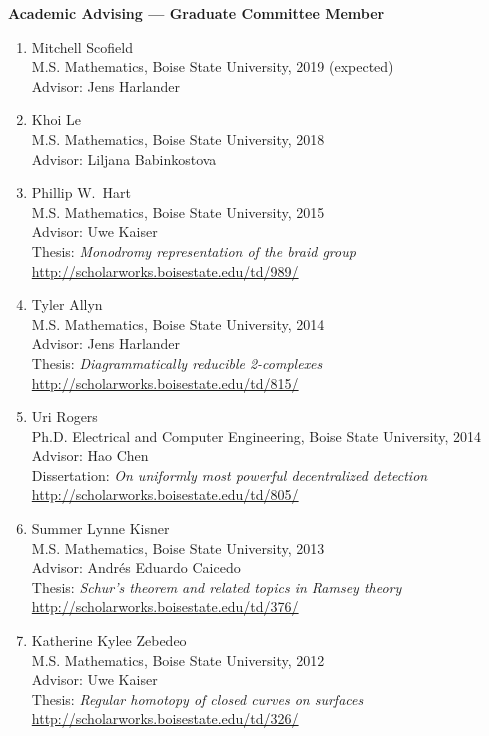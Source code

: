 \documentclass[12pt]{article}
\begin{document}
\textbf{Academic Advising --- Graduate Committee Member}
\begin{enumerate}

\item Mitchell Scofield \\
M.S. Mathematics, Boise State University, 2019 (expected) \\
Advisor: Jens Harlander

\item Khoi Le \\
M.S. Mathematics, Boise State University, 2018 \\
Advisor: Liljana Babinkostova

\item Phillip W.\ Hart \\
M.S. Mathematics, Boise State University, 2015 \\
Advisor: Uwe Kaiser \\
Thesis: \emph{Monodromy representation of the braid group} \\
\url{http://scholarworks.boisestate.edu/td/989/}

\item Tyler Allyn \\
M.S. Mathematics, Boise State University, 2014 \\
Advisor: Jens Harlander \\
Thesis: \emph{Diagrammatically reducible 2-complexes} \\
\url{http://scholarworks.boisestate.edu/td/815/}

\item Uri Rogers \\
Ph.D. Electrical and Computer Engineering, Boise State University, 2014 \\
Advisor: Hao Chen \\
Dissertation: \emph{On uniformly most powerful decentralized detection} \\
\url{http://scholarworks.boisestate.edu/td/805/}

\item Summer Lynne Kisner \\
M.S. Mathematics, Boise State University, 2013 \\
Advisor: Andr\'es Eduardo Caicedo \\
Thesis: \emph{Schur's theorem and related topics in Ramsey theory} \\
\url{http://scholarworks.boisestate.edu/td/376/}

\item Katherine Kylee Zebedeo \\
M.S. Mathematics, Boise State University, 2012 \\
Advisor: Uwe Kaiser \\
Thesis: \emph{Regular homotopy of closed curves on surfaces} \\
\url{http://scholarworks.boisestate.edu/td/326/}
\end{enumerate}
\end{document}
